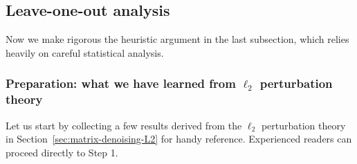 \subsection{Leave-one-out analysis}
\label{sec:LOO-analysis-rank1-denoising}
Now we make rigorous the heuristic argument in the last subsection, which relies heavily on careful statistical analysis.


\subsubsection{Preparation: what we have learned from $\ell_2$ perturbation theory}
%
Let us start by collecting a few results derived from the $\ell_2$ perturbation theory in Section~\ref{sec:matrix-denoising-L2} for handy reference. Experienced readers can proceed directly to Step 1.


